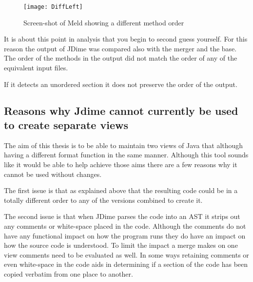 \begin{figure}[h]
\begin{center}
\texttt{[image: DiffLeft]}
\end{center}
 \caption{Screen-shot of Meld showing a different method order}
\end{figure}

It is about this point in analysis that you begin to second guess yourself.  For this reason the output of JDime was compared also with the merger and the base.  The order of the methods in the output did not match the order of any of the equivalent input files.  

If it detects an unordered section it does not preserve the order of the output.

\subsection{Reasons why Jdime cannot currently be used to create separate views}
The aim of this thesis is to be able to maintain two views of Java that although having a different format function in the same manner.  Although this tool sounds like it would be able to help achieve those aims there are a few reasons why it cannot be used without changes.

The first issue is that as explained above that the resulting code could be in a totally different order to any of the versions combined to create it.

The second issue is that when JDime parses the code into an AST it strips out any comments or white-space placed in the code.  Although the comments do not have any functional impact on how the program runs they do have an impact on how the source code is understood.  To limit the impact a merge makes on one view comments need to be evaluated as well. In some ways retaining comments or even white-space in the code aids in determining if a section of the code has been copied verbatim from one place to another.

